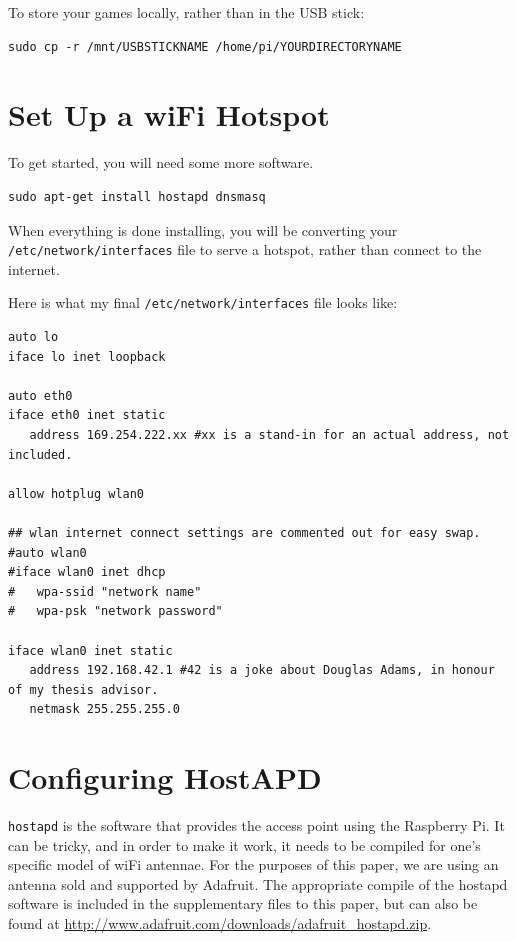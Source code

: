 To store your games locally, rather than in the USB stick:
\begin{lstlisting}
sudo cp -r /mnt/USBSTICKNAME /home/pi/YOURDIRECTORYNAME
\end{lstlisting}

\section{Set Up a wiFi Hotspot}
To get started, you will need some more software.

\begin{lstlisting}
sudo apt-get install hostapd dnsmasq
\end{lstlisting}

When everything is done installing, you will be converting your \texttt{/etc/network/interfaces} file to serve a hotspot, rather than connect to the internet. 

Here is what my final \texttt{/etc/network/interfaces} file looks like:

\begin{lstlisting}
auto lo
iface lo inet loopback

auto eth0
iface eth0 inet static
   address 169.254.222.xx #xx is a stand-in for an actual address, not included.

allow hotplug wlan0

## wlan internet connect settings are commented out for easy swap.
#auto wlan0
#iface wlan0 inet dhcp
#   wpa-ssid "network name"
#   wpa-psk "network password"

iface wlan0 inet static
   address 192.168.42.1 #42 is a joke about Douglas Adams, in honour of my thesis advisor.
   netmask 255.255.255.0

\end{lstlisting}

\section{Configuring HostAPD}
\texttt{hostapd} is the software that provides the access point using the Raspberry Pi. It can be tricky, and in order to make it work, it needs to be compiled for one's specific model of wiFi antennae. For the purposes of this paper, we are using an antenna sold and supported by Adafruit. The appropriate compile of the hostapd software is included in the supplementary files to this paper, but can also be found at \url{http://www.adafruit.com/downloads/adafruit_hostapd.zip}.

